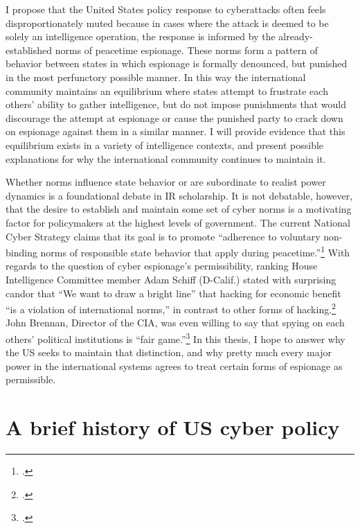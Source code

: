\documentclass{report}
\begin{document}
\begin{refsegment}
I propose that the United States policy response to cyberattacks often feels disproportionately muted because in cases where the attack is deemed to be solely an intelligence operation, the response is informed by the already-established norms of peacetime espionage. These norms form a pattern of behavior between states in which espionage is formally denounced, but punished in the most perfunctory possible manner. In this way the international community maintains an equilibrium where states attempt to frustrate each others' ability to gather intelligence, but do not impose punishments that would discourage the attempt at espionage or cause the punished party to crack down on espionage against them in a similar manner. I will provide evidence that this equilibrium exists in a variety of intelligence contexts, and present possible explanations for why the international community continues to maintain it.

Whether norms influence state behavior or are subordinate to realist power dynamics is a foundational debate in IR scholarship. It is not debatable, however, that the desire to establish and maintain some set of cyber norms is a motivating factor for policymakers at the highest levels of government. The current National Cyber Strategy claims that its goal is to promote ``adherence to voluntary non-binding norms of responsible state behavior that apply during peacetime.''\footcite[p.~20]{trump_national_2018} With regards to the question of cyber espionage's permissibility, ranking House Intelligence Committee member Adam Schiff (D-Calif.) stated with surprising candor that ``We want to draw a bright line” that hacking for economic benefit “is a violation of international norms,'' in contrast to other forms of hacking.\footcite{nakashima_hacks_2015} John Brennan, Director of the CIA, was even willing to say that spying on each others' political institutions is ``fair game.''\footcite{sanger_u.s._2016} In this thesis, I hope to answer why the US seeks to maintain that distinction, and why pretty much every major power in the international systems agrees to treat certain forms of espionage as permissible.

\section{A brief history of US cyber policy}

\end{refsegment}
\end{document}
